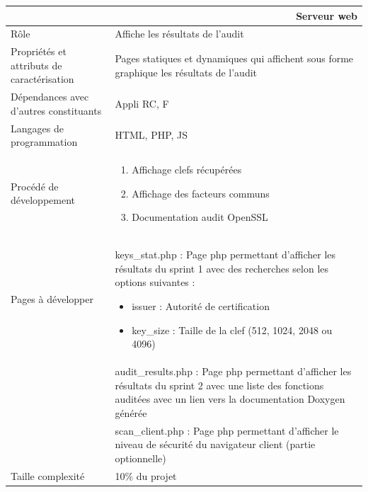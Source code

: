 \documentclass[a4paper,11pt,french]{article}
\begin{document}
\begin{center}
	\vspace*{0.7cm}
	\begin{tabularx}{16cm}{|l|X|}
	\hline
	\multicolumn{2}{|r|}{\textbf{Serveur web}}\\
	\hline
	R\^ole & Affiche les résultats de l'audit \\
	\hline
	Propriétés et attributs de caractérisation & Pages statiques et dynamiques qui affichent sous forme graphique les résultats de l'audit \\
	\hline
	Dépendances avec d'autres constituants & Appli RC, F \\
	\hline
	Langages de programmation & HTML, PHP, JS\\
	\hline
	Procédé de développement & \begin{enumerate} \item Affichage clefs récupérées \item Affichage des facteurs communs \item Documentation audit OpenSSL\end{enumerate}\\
	\hline
	Pages à développer  & keys\_stat.php : Page php permettant d'afficher les résultats du sprint 1 avec des recherches selon les options suivantes : \begin{itemize} \item issuer : Autorité de certification \item key\_size : Taille de la clef (512, 1024, 2048 ou 4096)\end{itemize}\\
	& audit\_results.php : Page php permettant d'afficher les résultats du sprint 2 avec une liste des fonctions auditées avec un lien vers la documentation Doxygen générée\\
	& scan\_client.php : Page php permettant d'afficher le niveau de sécurité du navigateur client (partie optionnelle)\\
	\hline
	Taille complexité & 10\% du projet\\
	\hline
	\end{tabularx}
\end{center}
\end{document}
